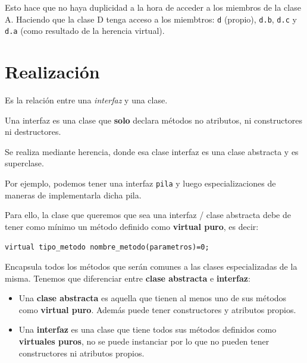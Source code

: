 Esto hace que no haya duplicidad a la hora de acceder a los miembros de la clase A. Haciendo que la clase D tenga acceso a los miembtros: \texttt{d} (propio), \texttt{d.b}, \texttt{d.c} y \texttt{d.a} (como resultado de la herencia virtual).

\newpage
\section{Realización}
Es la relación entre una \textit{interfaz} y una clase.

Una interfaz es una clase que \textbf{solo} declara métodos no atributos, ni constructores ni destructores.

Se realiza mediante herencia, donde esa clase interfaz es una clase abstracta y es superclase.

Por ejemplo, podemos tener una interfaz \texttt{pila} y luego especializaciones de maneras de implementarla dicha pila.

Para ello, la clase que queremos que sea una interfaz / clase abstracta debe de tener como mínimo un método definido como \textbf{virtual puro}, es decir:
\begin{center}
	\texttt{virtual tipo\_metodo nombre\_metodo(parametros)=0;}
\end{center} 

Encapsula todos los métodos que serán comunes a las clases especializadas de la misma.
Tenemos que diferenciar entre \textbf{clase abstracta} e \textbf{interfaz}:
\begin{itemize}
	\item Una \textbf{clase abstracta} es aquella que tienen al menos uno de sus métodos como \textbf{virtual puro}. Además puede tener constructores y atributos propios.
	\item Una \textbf{interfaz} es una clase que tiene todos sus métodos definidos como \textbf{virtuales puros}, no se puede instanciar por lo que no pueden tener constructores ni atributos propios.
\end{itemize}

